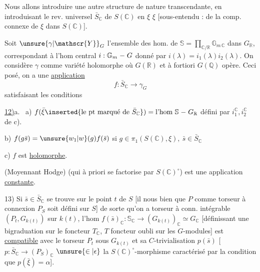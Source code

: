 Nous allons introduire une autre structure de nature transcendante, en introduisant le rev. universel $\bar S_{\mathbb C}$ de $S(\mathbb C)$ en $\xi$ $\xi$ [sous-entendu : de la comp. connexe de $\xi$ dans $S(\mathbb C)$].

Soit $\unsure{\gamma|\mathscr{Y}}_{G}$ l'ensemble des hom. de $\mathbb S=\prod_{\mathbb C/\mathbb R}\mathbb G_{m\,\mathbb C}$ dans $G_{\mathbb R}$, correspondant à l'hom central  $i:\mathbb G_m \relbar G$ donné par $i(\lambda)=i_1(\lambda)i_2(\lambda)$. \margin{\rule{0.35pt}{2.1\baselineskip}}On considère $\gamma$ comme variété  holomorphe où  $G(\mathbb R)$ et à fortiori $G(\mathbb Q)$ opère. Ceci posé, on a une \uline{application}
\[
\boxed{f:\bar S_{\mathbb C}\longrightarrow\gamma_G}
\]
satisfaisant les conditions

\uline{12)}a. \ a) $f(\bar\xi\inserted{\text{le pt marqué de }\bar S_{\mathbb C}})={}\text{l'hom }\mathbb S\relbar G_{\mathbb R}$ défini par $i_1^{\mathbb C},i_2^{\mathbb C}$ de c).

b) $f(g\bar s)=\unsure{w_{1}|w}(g)f(\bar s)$ si $g\in\pi_1(S(\mathbb C),\xi),\ \bar s\in\bar S_{\mathbb C}$

c) $f$ est \uline{holomorphe}.

 (Moyennant Hodge)   (qui à priori  se factorise par  $S(\mathbb C)^{\circ}$) est une application \uline{constante}.

13) Si $\bar s\in\bar S_{\mathbb C}$ se trouve sur le point $t$ de $S$ [il nous  bien que $P$ comme torseur à connexion  $P_S$ soit défini sur $S$] de sorte qu'on a torseur à conn. intégrable  $(P_t,G_{k(t)})$ sur $k(t)$,  l'hom $f(\bar s)_{\mathbb C}:\mathbb S_{\mathbb C}\longrightarrow(G_{k(t)})_{\mathbb C}\simeq G_{\mathbb C}$ [définissant une bigraduation sur le foncteur $T_{\mathbb C}$, $T$ foncteur oubli sur les $G$-modules] est \uline{compatible} avec le torseur $P_t$ sous $G_{k(t)}$ et sa $C$-trivialisation $p(\bar s)$ [$p:\bar S_{\mathbb C}\longrightarrow(P_S)_{\mathbb C}$ $\unsure{\in|\epsilon}$  la $S(\mathbb C)^{\circ}$-morphisme caractérisé par la condition que $p(\bar\xi)=\alpha$].
